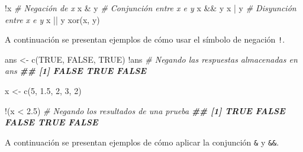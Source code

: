 \documentclass[
]{book}
\newenvironment{Shaded}{\begin{snugshade}}{\end{snugshade}}
\newcommand{\CommentTok}[1]{\textcolor[rgb]{0.56,0.35,0.01}{\textit{#1}}}
\newcommand{\ConstantTok}[1]{\textcolor[rgb]{0.00,0.00,0.00}{#1}}
\newcommand{\DecValTok}[1]{\textcolor[rgb]{0.00,0.00,0.81}{#1}}
\newcommand{\DocumentationTok}[1]{\textcolor[rgb]{0.56,0.35,0.01}{\textbf{\textit{#1}}}}
\newcommand{\FloatTok}[1]{\textcolor[rgb]{0.00,0.00,0.81}{#1}}
\newcommand{\FunctionTok}[1]{\textcolor[rgb]{0.00,0.00,0.00}{#1}}
\newcommand{\NormalTok}[1]{#1}
\newcommand{\OtherTok}[1]{\textcolor[rgb]{0.56,0.35,0.01}{#1}}
\newcommand{\SpecialCharTok}[1]{\textcolor[rgb]{0.00,0.00,0.00}{#1}}
\begin{document}
\begin{Shaded}
\begin{Highlighting}[]
\SpecialCharTok{!}\NormalTok{x  }\CommentTok{\# Negación de x}
\NormalTok{x }\SpecialCharTok{\&}\NormalTok{ y  }\CommentTok{\# Conjunción entre x e y}
\NormalTok{x }\SpecialCharTok{\&\&}\NormalTok{ y}
\NormalTok{x }\SpecialCharTok{|}\NormalTok{ y  }\CommentTok{\# Disyunción entre x e y}
\NormalTok{x }\SpecialCharTok{||}\NormalTok{ y}
\FunctionTok{xor}\NormalTok{(x, y)}
\end{Highlighting}
\end{Shaded}

A continuación se presentan ejemplos de cómo usar el símbolo de negación \texttt{!}.

\begin{Shaded}
\begin{Highlighting}[]
\NormalTok{ans }\OtherTok{\textless{}{-}} \FunctionTok{c}\NormalTok{(}\ConstantTok{TRUE}\NormalTok{, }\ConstantTok{FALSE}\NormalTok{, }\ConstantTok{TRUE}\NormalTok{)}
\SpecialCharTok{!}\NormalTok{ans  }\CommentTok{\# Negando las respuestas almacenadas en ans}
\DocumentationTok{\#\# [1] FALSE  TRUE FALSE}

\NormalTok{x }\OtherTok{\textless{}{-}} \FunctionTok{c}\NormalTok{(}\DecValTok{5}\NormalTok{, }\FloatTok{1.5}\NormalTok{, }\DecValTok{2}\NormalTok{, }\DecValTok{3}\NormalTok{, }\DecValTok{2}\NormalTok{)}

\SpecialCharTok{!}\NormalTok{(x }\SpecialCharTok{\textless{}} \FloatTok{2.5}\NormalTok{)  }\CommentTok{\# Negando los resultados de una prueba}
\DocumentationTok{\#\# [1]  TRUE FALSE FALSE  TRUE FALSE}
\end{Highlighting}
\end{Shaded}

A continuación se presentan ejemplos de cómo aplicar la conjunción \texttt{\&} y \texttt{\&\&}.
\end{document}
